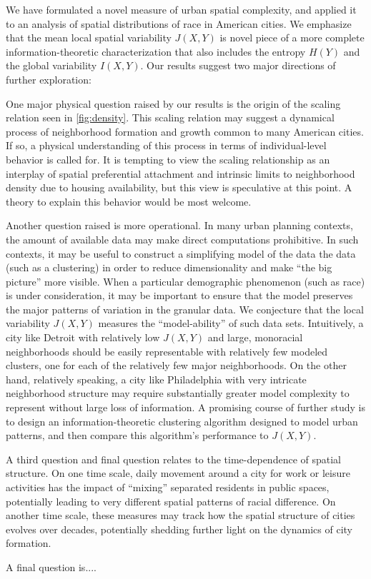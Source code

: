 We have formulated a novel measure of urban spatial complexity, and applied it to an analysis of spatial distributions of race in American cities. We emphasize that the mean local spatial variability $J(X,Y)$ is novel piece of a more complete information-theoretic characterization that also includes the entropy $H(Y)$ and the global variability $I(X,Y)$. Our results suggest two major directions of further exploration: 

One major physical question raised by our results is the origin of the scaling relation seen in \ref{fig:density}. This scaling relation may suggest a dynamical process of neighborhood formation and growth common to many American cities. If so, a physical understanding of this process in terms of individual-level behavior is called for. It is tempting to view the scaling relationship as an interplay of spatial preferential attachment and intrinsic limits to neighborhood density due to housing availability, but this view is speculative at this point. A theory to explain this behavior would be most welcome. 

Another question raised is more operational. In many urban planning contexts, the amount of available data may make direct computations prohibitive. In such contexts, it may be useful to construct a simplifying model of the data the data (such as a clustering) in order to reduce dimensionality and make ``the big picture'' more visible. When a particular demographic phenomenon (such as race) is under consideration, it may be important to ensure that the model preserves the major patterns of variation in the granular data. We conjecture that the local variability $J(X,Y)$ measures the ``model-ability'' of such data sets. Intuitively, a city like Detroit with relatively low $J(X,Y)$ and large, monoracial neighborhoods should be easily representable with relatively few modeled clusters, one for each of the relatively few major neighborhoods. On the other hand, relatively speaking, a city like Philadelphia with very intricate neighborhood structure may require substantially greater model complexity to represent without large loss of information. A promising course of further study is to design an information-theoretic clustering algorithm designed to model urban patterns, and then compare this algorithm's performance to $J(X,Y)$. 

A third question and final question relates to the time-dependence of spatial structure. On one time scale, daily movement around a city for work or leisure activities has the impact of ``mixing'' separated residents in public spaces, potentially leading to very different spatial patterns of racial difference. On another time scale, these measures may track how the spatial structure of cities evolves over decades, potentially shedding further light on the dynamics of city formation. 

A final question is....